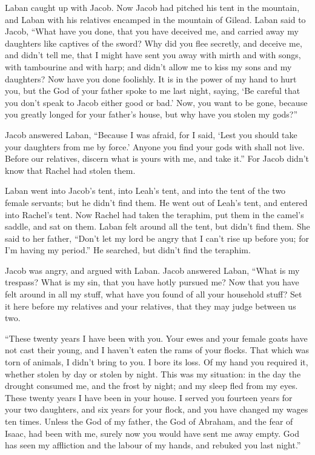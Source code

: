  Laban caught up with Jacob. Now Jacob had pitched his tent
in the mountain, and Laban with his relatives encamped in the mountain
of Gilead.  Laban said to Jacob, ``What have you done, that
you have deceived me, and carried away my daughters like captives of the
sword?  Why did you flee secretly, and deceive me, and
didn't tell me, that I might have sent you away with mirth and with
songs, with tambourine and with harp;  and didn't allow me
to kiss my sons and my daughters? Now have you done foolishly.
 It is in the power of my hand to hurt you, but the God of
your father spoke to me last night, saying, `Be careful that you don't
speak to Jacob either good or bad.'  Now, you want to be
gone, because you greatly longed for your father's house, but why have
you stolen my gods?''

 Jacob answered Laban, ``Because I was afraid, for I said,
`Lest you should take your daughters from me by force.' 
Anyone you find your gods with shall not live. Before our relatives,
discern what is yours with me, and take it.'' For Jacob didn't know that
Rachel had stolen them.

 Laban went into Jacob's tent, into Leah's tent, and into
the tent of the two female servants; but he didn't find them. He went
out of Leah's tent, and entered into Rachel's tent.  Now
Rachel had taken the teraphim, put them in the camel's saddle, and sat
on them. Laban felt around all the tent, but didn't find them.
 She said to her father, ``Don't let my lord be angry that
I can't rise up before you; for I'm having my period.'' He searched, but
didn't find the teraphim.

 Jacob was angry, and argued with Laban. Jacob answered
Laban, ``What is my trespass? What is my sin, that you have hotly
pursued me?  Now that you have felt around in all my stuff,
what have you found of all your household stuff? Set it here before my
relatives and your relatives, that they may judge between us two.

 ``These twenty years I have been with you. Your ewes and
your female goats have not cast their young, and I haven't eaten the
rams of your flocks.  That which was torn of animals, I
didn't bring to you. I bore its loss. Of my hand you required it,
whether stolen by day or stolen by night.  This was my
situation: in the day the drought consumed me, and the frost by night;
and my sleep fled from my eyes.  These twenty years I have
been in your house. I served you fourteen years for your two daughters,
and six years for your flock, and you have changed my wages ten times.
 Unless the God of my father, the God of Abraham, and the
fear of Isaac, had been with me, surely now you would have sent me away
empty. God has seen my affliction and the labour of my hands, and
rebuked you last night.''

